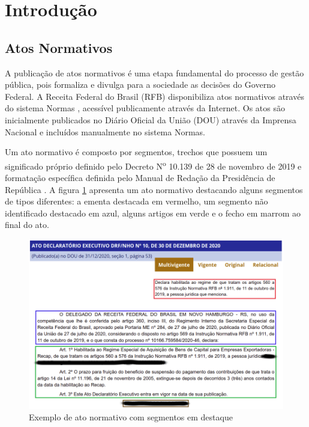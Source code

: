 \section{Introdução}

\subsection{Atos Normativos}

A publicação de atos normativos é uma etapa fundamental do processo de gestão pública, pois formaliza e divulga para a sociedade as decisões do Governo Federal. A Receita Federal do Brasil (RFB) disponibiliza atos normativos através do sistema Normas \cite{Normas2021}, acessível publicamente através da Internet. Os atos são inicialmente publicados no Diário Oficial da União (DOU) através da Imprensa Nacional \cite{ImprensaNacional2021} e incluídos manualmente no sistema Normas.

Um ato normativo é composto por segmentos, trechos que possuem um significado próprio definido pelo Decreto N\textsuperscript{o} 10.139 de 28 de novembro de 2019 \cite{Decreto10139} e formatação específica definida pelo Manual de Redação da Presidência de República \cite{ManualRedacao2018}. A figura \ref{fig:segmentos} apresenta um ato normativo destacando alguns segmentos de tipos diferentes: a ementa destacada em vermelho, um segmento não identificado destacado em azul, alguns artigos em verde e o fecho em marrom ao final do ato. 

\begin{figure}[h]
	\caption{Exemplo de ato normativo com segmentos em destaque}
	\center
	\label{fig:segmentos}
	\includegraphics[scale=1.9]{introducao/segmentos.png}
\end{figure}


